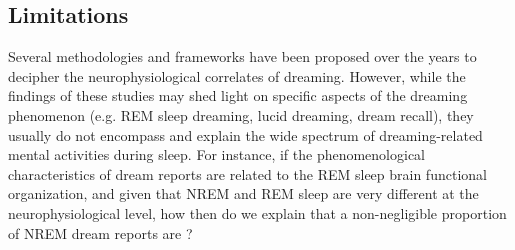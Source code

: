 \subsection{Limitations}
\label{sec:dream-research:attempts:limitations}

Several methodologies and frameworks have been proposed over the years to decipher the neurophysiological correlates of dreaming. However, while the findings of these studies may shed light on specific aspects of the dreaming phenomenon (e.g. REM sleep dreaming, lucid dreaming, dream recall), they usually do not encompass and explain the wide spectrum of dreaming-related mental activities during sleep. For instance, if the phenomenological characteristics of dream reports are related to the REM sleep brain functional organization, and given that NREM and REM sleep are very different at the neurophysiological level, how then do we explain that a non-negligible proportion of NREM dream reports are  \citep{hobson_dreaming_1988}? 
